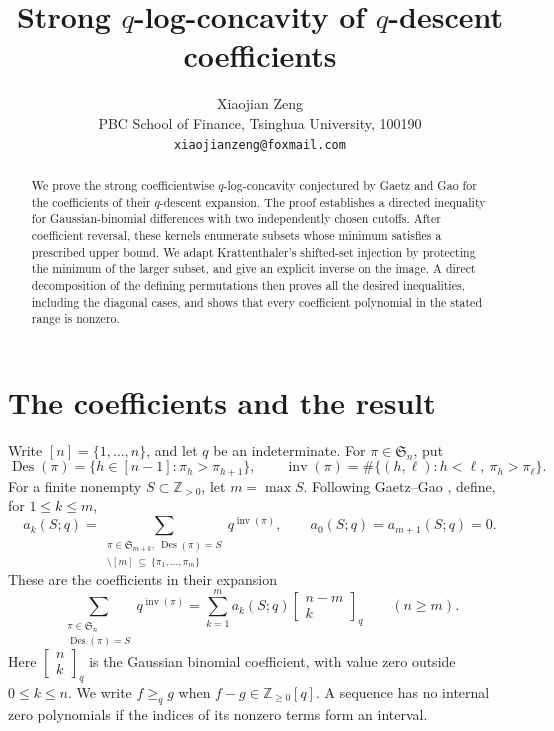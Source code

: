 \documentclass[11pt,a4paper]{article}
\title{Strong $q$-log-concavity of $q$-descent coefficients}
\author{Xiaojian Zeng\\[2pt]
  \small PBC School of Finance, Tsinghua University, 100190\\
  \small \texttt{xiaojianzeng@foxmail.com}}
\date{}
\theoremstyle{remark}
\DeclareMathOperator{\Des}{Des}
\DeclareMathOperator{\inv}{inv}
\newcommand{\NN}{\mathbb Z_{\geq0}}
\newcommand{\Sym}{\mathfrak S}
\begin{document}
\maketitle
\begin{abstract}
We prove the strong coefficientwise $q$-log-concavity conjectured by
Gaetz and Gao for the coefficients of their $q$-descent expansion.
The proof establishes a directed inequality for Gaussian-binomial
differences with two independently chosen cutoffs. After coefficient
reversal, these kernels enumerate subsets whose minimum satisfies a
prescribed upper bound. We adapt Krattenthaler's shifted-set injection by
protecting the minimum of the larger subset, and give an explicit inverse
on the image. A direct decomposition of the defining permutations then
proves all the desired inequalities, including the diagonal cases, and
shows that every coefficient polynomial in the stated range is nonzero.
\end{abstract}

\section{The coefficients and the result}

Write $[n]=\{1,\ldots,n\}$, and let $q$ be an indeterminate. For
$\pi\in\Sym_n$, put
\[
 \Des(\pi)=\{h\in[n-1]:\pi_h>\pi_{h+1}\},\qquad
 \inv(\pi)=\#\{(h,\ell):h<\ell,\ \pi_h>\pi_\ell\}.
\]
For a finite nonempty $S\subset\mathbb Z_{>0}$, let $m=\max S$.
Following Gaetz--Gao \cite[Theorem 5]{GaetzGao}, define, for $1\leq k\leq m$,
\begin{equation}\label{eq:a-def}
 a_k(S;q)=
 \sum_{\substack{\pi\in\Sym_{m+k},\ \Des(\pi)=S\\
 [m+k]\setminus[m]\ \subseteq\ \{\pi_1,\ldots,\pi_m\}}}
 q^{\inv(\pi)},
 \qquad a_0(S;q)=a_{m+1}(S;q)=0.
\end{equation}
These are the coefficients in their expansion
\[
 \sum_{\substack{\pi\in\Sym_n\\\Des(\pi)=S}}q^{\inv(\pi)}
   =\sum_{k=1}^{m}a_k(S;q)\left[\begin{smallmatrix}n-m\\k\end{smallmatrix}\right]_{q}\qquad(n\geq m).
\]
Here $\left[\begin{smallmatrix}n\\k\end{smallmatrix}\right]_{q}$ is the Gaussian binomial coefficient, with value zero
outside $0\leq k\leq n$. We write $f\geq_q g$ when $f-g\in\NN[q]$.
A sequence has no internal zero polynomials if the indices of its
nonzero terms form an interval.
\end{document}
